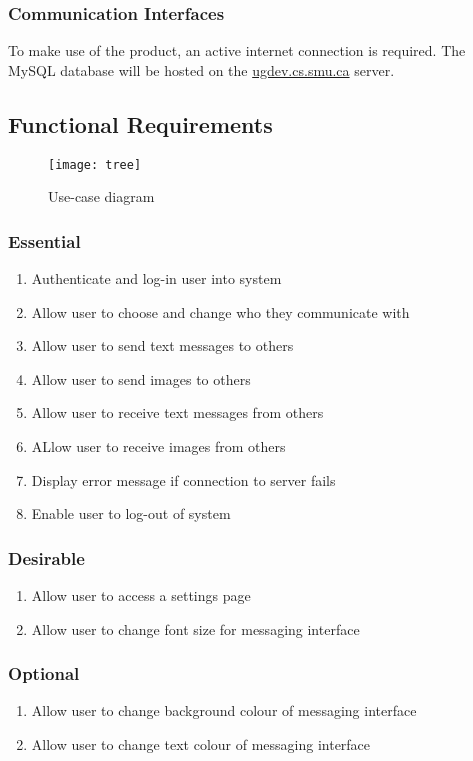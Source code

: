 \documentclass[11pt]{article}
\begin{document}
\subsubsection{Communication Interfaces}
To make use of the product, an active internet connection is required. The MySQL database will be
hosted on the \url{ugdev.cs.smu.ca} server.

\subsection{Functional Requirements}

\begin{figure}[!htb]
  \texttt{[image: tree]}
  \caption{Use-case diagram}
\end{figure}

\subsubsection{Essential}
\begin{enumerate}
    \item Authenticate and log-in user into system
    \item Allow user to choose and change who they communicate with
    \item Allow user to send text messages to others
    \item Allow user to send images to others
    \item Allow user to receive text messages from others
    \item ALlow user to receive images from others
    \item Display error message if connection to server fails
    \item Enable user to log-out of system
\end{enumerate}

\subsubsection{Desirable}
\begin{enumerate}
    \item Allow user to access a settings page
    \item Allow user to change font size for messaging interface
\end{enumerate}

\subsubsection{Optional}
\begin{enumerate}
    \item Allow user to change background colour of messaging interface
    \item Allow user to change text colour of messaging interface
\end{enumerate}
\end{document}
